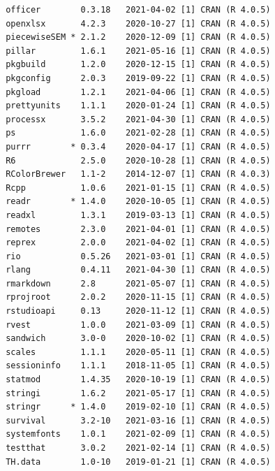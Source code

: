\documentclass [11pt, proquest] {uwthesis}[2015/03/03]
\begin{document}
\begin{verbatim}
 officer        0.3.18   2021-04-02 [1] CRAN (R 4.0.5)                       
 openxlsx       4.2.3    2020-10-27 [1] CRAN (R 4.0.5)                       
 piecewiseSEM * 2.1.2    2020-12-09 [1] CRAN (R 4.0.5)                       
 pillar         1.6.1    2021-05-16 [1] CRAN (R 4.0.5)                       
 pkgbuild       1.2.0    2020-12-15 [1] CRAN (R 4.0.5)                       
 pkgconfig      2.0.3    2019-09-22 [1] CRAN (R 4.0.5)                       
 pkgload        1.2.1    2021-04-06 [1] CRAN (R 4.0.5)                       
 prettyunits    1.1.1    2020-01-24 [1] CRAN (R 4.0.5)                       
 processx       3.5.2    2021-04-30 [1] CRAN (R 4.0.5)                       
 ps             1.6.0    2021-02-28 [1] CRAN (R 4.0.5)                       
 purrr        * 0.3.4    2020-04-17 [1] CRAN (R 4.0.5)                       
 R6             2.5.0    2020-10-28 [1] CRAN (R 4.0.5)                       
 RColorBrewer   1.1-2    2014-12-07 [1] CRAN (R 4.0.3)                       
 Rcpp           1.0.6    2021-01-15 [1] CRAN (R 4.0.5)                       
 readr        * 1.4.0    2020-10-05 [1] CRAN (R 4.0.5)                       
 readxl         1.3.1    2019-03-13 [1] CRAN (R 4.0.5)                       
 remotes        2.3.0    2021-04-01 [1] CRAN (R 4.0.5)                       
 reprex         2.0.0    2021-04-02 [1] CRAN (R 4.0.5)                       
 rio            0.5.26   2021-03-01 [1] CRAN (R 4.0.5)                       
 rlang          0.4.11   2021-04-30 [1] CRAN (R 4.0.5)                       
 rmarkdown      2.8      2021-05-07 [1] CRAN (R 4.0.5)                       
 rprojroot      2.0.2    2020-11-15 [1] CRAN (R 4.0.5)                       
 rstudioapi     0.13     2020-11-12 [1] CRAN (R 4.0.5)                       
 rvest          1.0.0    2021-03-09 [1] CRAN (R 4.0.5)                       
 sandwich       3.0-0    2020-10-02 [1] CRAN (R 4.0.5)                       
 scales         1.1.1    2020-05-11 [1] CRAN (R 4.0.5)                       
 sessioninfo    1.1.1    2018-11-05 [1] CRAN (R 4.0.5)                       
 statmod        1.4.35   2020-10-19 [1] CRAN (R 4.0.5)                       
 stringi        1.6.2    2021-05-17 [1] CRAN (R 4.0.5)                       
 stringr      * 1.4.0    2019-02-10 [1] CRAN (R 4.0.5)                       
 survival       3.2-10   2021-03-16 [1] CRAN (R 4.0.5)                       
 systemfonts    1.0.1    2021-02-09 [1] CRAN (R 4.0.5)                       
 testthat       3.0.2    2021-02-14 [1] CRAN (R 4.0.5)                       
 TH.data        1.0-10   2019-01-21 [1] CRAN (R 4.0.5)                       

\end{verbatim}
\end{document}
